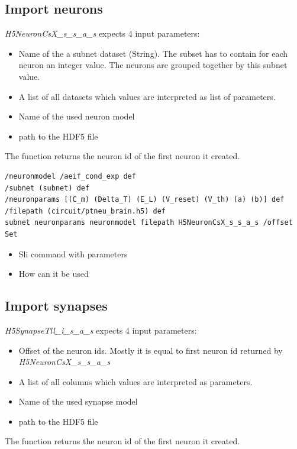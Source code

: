\subsection{Import neurons}
\emph{H5NeuronCsX\_s\_s\_a\_s} expects 4 input parameters:
\begin{itemize}
      \item Name of the a subnet dataset (String).
The subset has to contain for each neuron an integer value.
The neurons are grouped together by this subnet value.

      \item A list of all datasets which values are interpreted as list of parameters.
      
      \item Name of the used neuron model
      
      \item path to the HDF5 file 
\end{itemize}
The function returns the neuron id of the first neuron it created.

\begin{lstlisting}[label=sliNeurons,caption=Calling the neuron import module via H5NeuronCsX\_s\_s\_a\_s SLI command ]
/neuronmodel /aeif_cond_exp def
/subnet (subnet) def
/neuronparams [(C_m) (Delta_T) (E_L) (V_reset) (V_th) (a) (b)] def
/filepath (circuit/ptneu_brain.h5) def
subnet neuronparams neuronmodel filepath H5NeuronCsX_s_s_a_s /offset Set
\end{lstlisting}



\begin{itemize}
      \item Sli command with parameters
      \item How can it be used
\end{itemize}

\subsection{Import synapses}
\emph{H5SynapseTll\_i\_s\_a\_s} expects 4 input parameters:
\begin{itemize}
      \item Offset of the neuron ids. Mostly it is equal to first neuron id returned by \emph{H5NeuronCsX\_s\_s\_a\_s}

      \item A list of all columns which values are interpreted as parameters.
      
      \item Name of the used synapse model
      
      \item path to the HDF5 file 
\end{itemize}
The function returns the neuron id of the first neuron it created.

